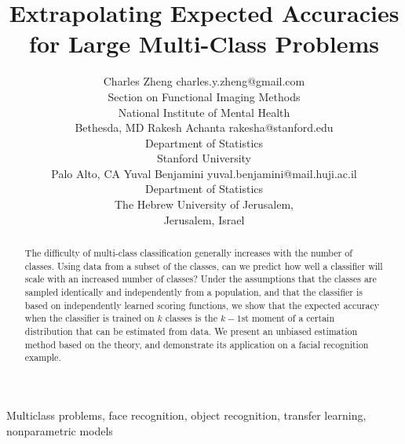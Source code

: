 \documentclass[twoside,11pt]{article}
\begin{document}
\title{Extrapolating Expected Accuracies for Large Multi-Class Problems}

\editor{}

\author{\name Charles Zheng \email charles.y.zheng@gmail.com \\
       \addr Section on Functional Imaging Methods\\
       National Institute of Mental Health\\
       Bethesda, MD 
       \AND
       \name Rakesh Achanta \email rakesha@stanford.edu \\
       \addr Department of Statistics\\
       Stanford University\\
       Palo Alto, CA 
       \AND
       \name Yuval Benjamini \email yuval.benjamini@mail.huji.ac.il \\
       \addr Department of Statistics\\
       The Hebrew University of Jerusalem,\\
       Jerusalem, Israel}

\maketitle

\begin{abstract}%
The difficulty of multi-class classification generally increases with
the number of classes.  Using data from a subset of the classes, can
we predict how well a classifier will scale with an increased number
of classes?  Under the assumptions that the classes are sampled
identically and independently from a population, and that the classifier is based on independently learned
scoring functions, we show that the expected accuracy when the
classifier is trained on $k$ classes is the $k-1$st moment of a
certain distribution that can be estimated from data.  We present an
unbiased estimation method based on the theory, and demonstrate its
application on a facial recognition example.
\end{abstract}

\begin{keywords}
Multiclass problems, face recognition, object recognition, transfer learning, nonparametric models
\end{keywords}
\end{document}
